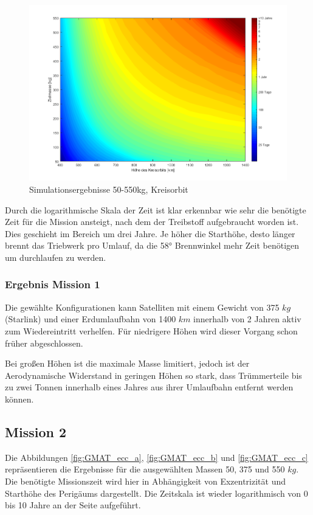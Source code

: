 \begin{figure}[h!]
	\centering
		\includegraphics[width=1.00\textwidth]{./graphics/GMAT/GMAT_Mass_over_Height_550.png}
		\caption{Simulationsergebnisse 50-550kg, Kreisorbit}
	\label{fig:GMAT_Mass_over_Height_550}
\end{figure}


	Durch die logarithmische Skala der Zeit ist klar erkennbar wie sehr die benötigte Zeit für die Mission ansteigt, nach dem der Treibstoff aufgebraucht worden ist. Dies geschieht im Bereich um drei Jahre. Je höher die Starthöhe, desto länger brennt das Triebwerk pro Umlauf, da die 58° Brennwinkel mehr Zeit benötigen um durchlaufen zu werden. 

\subsubsection{Ergebnis Mission 1}

	Die gewählte Konfigurationen kann Satelliten mit einem Gewicht von 375 $kg$ (Starlink) und einer Erdumlaufbahn von 1400 $km$ innerhalb von 2 Jahren  aktiv zum Wiedereintritt verhelfen. Für niedrigere Höhen wird dieser Vorgang schon früher abgeschlossen. 

	Bei großen Höhen ist die maximale Masse limitiert, jedoch ist der Aerodynamische Widerstand in geringen Höhen so stark, dass Trümmerteile bis zu zwei Tonnen innerhalb eines Jahres aus ihrer Umlaufbahn entfernt werden können. 
\newpage
\subsection{Mission 2}

	Die Abbildungen \ref{fig:GMAT_ecc_a}, \ref{fig:GMAT_ecc_b} und \ref{fig:GMAT_ecc_c} repräsentieren die Ergebnisse für die ausgewählten Massen 50, 375 und 550 $kg$. Die benötigte Missionszeit wird hier in Abhängigkeit von Exzentrizität und Starthöhe des Perigäums dargestellt. Die Zeitskala ist wieder logarithmisch von 0 bis 10 Jahre an der Seite aufgeführt.


